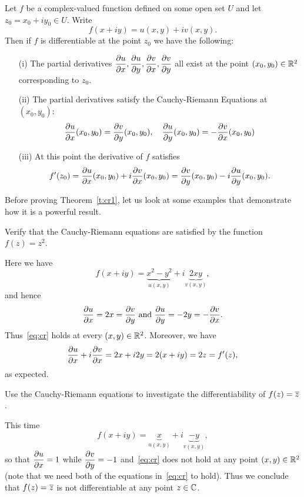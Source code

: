\begin{theorem}
\label{t:cr1}

Let $f$ be a complex-valued function defined on some open set $U$ and let $z_0=x_0+iy_0 \in U$.  Write
\[
f(x+iy) = u(x,y)+iv(x,y).
\]
Then if $f$ is differentiable at the point $z_0$ we have the following:

\begin{enumerate}
\item[(i)] The partial derivatives $\dfrac{\partial u}{\partial x}, \dfrac{\partial u}{\partial y}, \dfrac{\partial v}{\partial x}, \dfrac{\partial v}{\partial y}$ all exist at the point $(x_0,y_0) \in \mathbb{R}^2$ corresponding to $z_0$.
\item[(ii)] The partial derivatives satisfy the Cauchy-Riemann Equations at $(x_0,y_0)$:
\begin{equation}
\label{eq:cr}
\dfrac{\partial u}{\partial x} (x_0,y_0) = \dfrac{\partial v}{\partial y} (x_0,y_0),\quad \dfrac{\partial u}{\partial y} (x_0,y_0) = - \dfrac{\partial v}{\partial x} (x_0,y_0)
\end{equation}
\item[(iii)] At this point  the derivative of $f$ satisfies
\[
f'(z_0)= \dfrac{\partial u}{\partial x} (x_0,y_0) + i \dfrac{\partial v}{\partial x} (x_0,y_0) = \dfrac{\partial v}{\partial y} (x_0,y_0) - i \dfrac{\partial u}{\partial y} (x_0,y_0).
\]
\end{enumerate}
\end{theorem}

Before proving Theorem~\ref{t:cr1}, let us look at some examples that demonstrate how it is a powerful result.



\begin{example}
 Verify that the Cauchy-Riemann equations are satisfied by the function  $f(z)=z^2$.\\
\end{example}
\begin{solution}
Here we have
\[
f(x+iy) = \underbrace{x^2-y^2}_{u(x,y)} + i \underbrace{2xy}_{v(x,y)},
\]
and hence
\[
\dfrac{\partial u}{\partial x} = 2x = \dfrac{\partial v}{\partial y} \text{ and } \dfrac{\partial u}{\partial y} = -2y = - \dfrac{\partial v}{\partial x}.
\]
Thus~\eqref{eq:cr} holds at every $(x,y) \in \mathbb{R}^2$.  Moreover, we have
\[
\dfrac{\partial u}{\partial x} + i \dfrac{\partial v}{\partial x} = 2x+i2y = 2(x+iy) = 2z = f'(z),
\]
as expected.
\end{solution}
\begin{example} Use the Cauchy-Riemann equations to investigate the differentiability of $f(z)=\overline{z}$.
\end{example}

\begin{solution}
This time
\[
f(x+iy) = \underbrace{x}_{u(x,y)} + i \underbrace{-y}_{v(x,y)},
\]
so that $\dfrac{\partial u}{\partial x} = 1$ while $\dfrac{\partial v}{\partial y}=-1$ and~\eqref{eq:cr} does not hold at any point $(x,y) \in \mathbb{R}^2$ (note that we need both of the equations in~\eqref{eq:cr} to hold).
 Thus we conclude that $f(z) = \overline{z}$ is not differentiable at any point $ z \in \mathbb{C}$.
 \end{solution}

